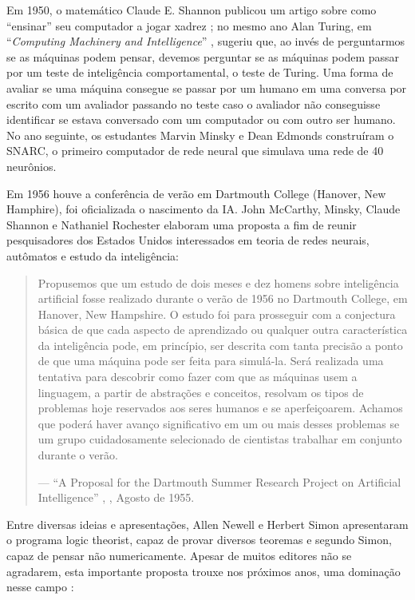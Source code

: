 \documentclass[
]{book}
\begin{document}
Em 1950, o matemático Claude E. Shannon publicou um artigo sobre como ``ensinar'' seu computador a jogar xadrez \citep{shannon1950xxii}; no mesmo ano Alan Turing, em ``\emph{Computing Machinery and Intelligence}'' \citep{turing1950computing},
sugeriu que, ao invés de perguntarmos se as máquinas podem pensar, devemos perguntar se as máquinas podem passar por um teste de inteligência comportamental, o teste de Turing. Uma forma de avaliar se uma máquina consegue se passar por um humano em uma conversa por escrito com um avaliador passando no teste caso o avaliador não conseguisse identificar se estava conversado com um computador ou com outro ser humano. No ano seguinte, os estudantes Marvin Minsky e Dean Edmonds construíram o SNARC, o primeiro computador de rede neural que simulava uma rede de 40 neurônios.

Em 1956 houve a conferência de verão em Dartmouth College (Hanover, New Hamphire), foi oficializada o nascimento da IA. John McCarthy, Minsky, Claude Shannon e Nathaniel Rochester elaboram uma proposta a fim de reunir pesquisadores dos Estados Unidos interessados em teoria de redes neurais, autômatos e estudo da inteligência:

\begin{quote}
Propusemos que um estudo de dois meses e dez homens sobre inteligência artificial fosse realizado durante o verão de 1956 no Dartmouth College, em Hanover, New Hampshire. O estudo foi para prosseguir com a conjectura básica de que cada aspecto de aprendizado ou qualquer outra característica da inteligência pode, em princípio, ser descrita com tanta precisão a ponto de
que uma máquina pode ser feita para simulá-la. Será realizada uma tentativa para descobrir como fazer com que as máquinas usem a linguagem, a partir de abstrações e conceitos, resolvam os tipos
de problemas hoje reservados aos seres humanos e se aperfeiçoarem. Achamos que poderá haver avanço significativo em um ou mais desses problemas se um grupo cuidadosamente selecionado de cientistas trabalhar em conjunto durante o verão.

--- ``A Proposal for the Dartmouth Summer Research Project on Artificial Intelligence'' , \citet{mccarthy2006proposal} , Agosto de 1955.
\end{quote}

Entre diversas ideias e apresentações, Allen Newell e Herbert Simon apresentaram o programa logic theorist, capaz de provar diversos teoremas e segundo Simon, capaz de pensar não numericamente. Apesar de muitos editores não se agradarem, esta importante proposta trouxe nos próximos anos, uma dominação nesse campo \citep{russel2004inteligencia}:
\end{document}
